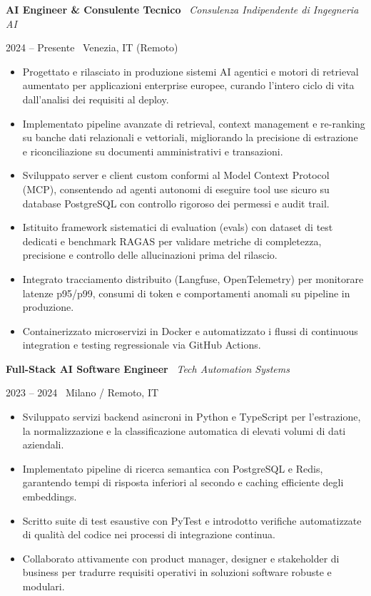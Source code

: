 \documentclass[a4paper,10pt]{article}
\newcommand{\role}[4]{%
  \vspace{2pt}\noindent
  \begin{minipage}[t]{0.70\textwidth}\raggedright\textbf{#1} \textbullet\ \textit{#3}\end{minipage}%
  \hfill
  \begin{minipage}[t]{0.28\textwidth}\raggedleft\footnotesize\color{gray}#2 \textbullet\ #4\end{minipage}%
  \vspace{1pt}%
}
\begin{document}
\role{AI Engineer \& Consulente Tecnico}{2024 -- Presente}{Consulenza Indipendente di Ingegneria AI}{Venezia, IT (Remoto)}
\begin{itemize}
  \item Progettato e rilasciato in produzione sistemi AI agentici e motori di retrieval aumentato per applicazioni enterprise europee, curando l'intero ciclo di vita dall'analisi dei requisiti al deploy.
  \item Implementato pipeline avanzate di retrieval, context management e re-ranking su banche dati relazionali e vettoriali, migliorando la precisione di estrazione e riconciliazione su documenti amministrativi e transazioni.
  \item Sviluppato server e client custom conformi al Model Context Protocol (MCP), consentendo ad agenti autonomi di eseguire tool use sicuro su database PostgreSQL con controllo rigoroso dei permessi e audit trail.
  \item Istituito framework sistematici di evaluation (evals) con dataset di test dedicati e benchmark RAGAS per validare metriche di completezza, precisione e controllo delle allucinazioni prima del rilascio.
  \item Integrato tracciamento distribuito (Langfuse, OpenTelemetry) per monitorare latenze p95/p99, consumi di token e comportamenti anomali su pipeline in produzione.
  \item Containerizzato microservizi in Docker e automatizzato i flussi di continuous integration e testing regressionale via GitHub Actions.
\end{itemize}

\vspace{3pt}
\role{Full-Stack AI Software Engineer}{2023 -- 2024}{Tech Automation Systems}{Milano / Remoto, IT}
\begin{itemize}
  \item Sviluppato servizi backend asincroni in Python e TypeScript per l'estrazione, la normalizzazione e la classificazione automatica di elevati volumi di dati aziendali.
  \item Implementato pipeline di ricerca semantica con PostgreSQL e Redis, garantendo tempi di risposta inferiori al secondo e caching efficiente degli embeddings.
  \item Scritto suite di test esaustive con PyTest e introdotto verifiche automatizzate di qualità del codice nei processi di integrazione continua.
  \item Collaborato attivamente con product manager, designer e stakeholder di business per tradurre requisiti operativi in soluzioni software robuste e modulari.
\end{itemize}
\end{document}
